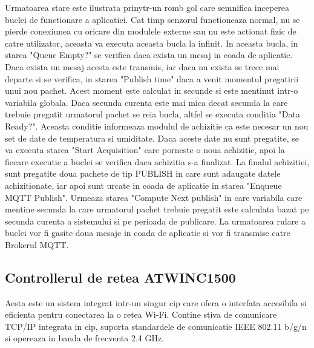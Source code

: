 Urmatoarea stare este ilustrata prinytr-un romb gol care semnifica inceperea buclei de functionare a aplicatiei. Cat timp senzorul functioneaza normal, nu se pierde 
conexiunea cu oricare din modulele externe sau nu este actionat fizic de catre utilizator, aceasta va executa aceasta bucla la infinit. In aceasta bucla, in starea 
"Queue Empty?" se verifica daca exista un mesaj in coada de aplicatie. Daca exista un mesaj acesta este transmis, iar daca nu exista se trece mai departe si se verifica, 
in starea "Publish time" daca a venit momentul pregatirii unui nou pachet. Acest moment este calculat in secunde si este mentinut intr-o variabila globala. Daca 
secunda curenta este mai mica decat secunda la care trebuie pregatit urmatorul pachet se reia bucla, altfel se executa conditia "Data Ready?". Aceasta conditie 
informeaza modulul de achizitie ca este necesar un nou set de date de temperatura si umiditate. Daca aceste date nu sunt pregatite, se va executa starea "Start Acquisition" 
care porneste o noua achizitie, apoi la fiecare executie a buclei se verifica daca achizitia s-a finalizat. La finalul achizitiei, sunt pregatite doua pachete de tip 
PUBLISH in care sunt adaugate datele achizitionate, iar apoi sunt urcate in coada de aplicatie in starea "Enqueue MQTT Publish". Urmeaza starea "Compute Next publish" 
in care variabila care mentine secunda la care urmatorul pachet trebuie pregatit este calculata bazat pe secunda curenta a sistemului si pe perioada de publicare. La 
urmatoarea rulare a buclei vor fi gasite doua mesaje in coada de aplicatie si vor fi transmise catre Brokerul MQTT.

\subsection{Controllerul de retea ATWINC1500}\label{subsec:atwinc1500}
Aesta este un sistem integrat intr-un singur cip care ofera o interfata accesibila si eficienta pentru conectarea la o retea Wi-Fi. Contine stiva de comunicare TCP/IP 
integrata in cip, suporta standardele de comunicatie IEEE 802.11 b/g/n si opereaza in banda de frecventa 2.4 GHz.

